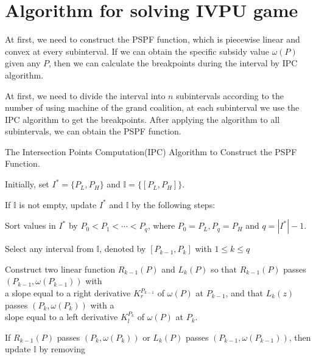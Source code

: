 \section*{Algorithm for solving IVPU game}

At first, we need to construct the PSPF function, which is piecewise linear and convex at every subinterval. If we can obtain the specific subsidy value $\omega(P)$ given any $P$, then we can calculate the breakpoints during the interval by IPC algorithm.

At first, we need to divide the interval into $n$ subintervals according to the  number of using machine of the grand coalition, at each subinterval we use the IPC algorithm to get the breakpoints. After applying the algorithm to all subintervals, we can obtain the PSPF function.


\begin{algorithm}[h]\label{algoIPC}
\caption{The Intersection Points Computation(IPC) Algorithm to Construct the PSPF Function.}
\begin{algorithmic}[1]

\begin{description}
  \justifying
  \item[Step 1.] Initially, set $I^*=\{P_L,P_H\}$ and $\mathbb{I}= \{[P_L,P_H]\}$.
  \item[Step 2.] If $\mathbb{I}$ is not empty, update $I^*$ and $\mathbb{I}$ by the following steps:
  \item[Step 3.] Sort values in $I^*$ by $P_0<P_1<\cdots<P_q$, where $P_0 = P_L,P_q = P_H$ and $q = |I^*|-1$.
  \item[Step 4.]
  Select any interval from $\mathbb{I}$, denoted by $[P_{k-1},P_{k}]$ with $1\leq k \leq q$
  \item[Step 5.]
  Construct two linear function $ R_{k-1}(P)$ and $ L_{k}(P)$ so that $ R_{k-1}(P)$ passes $(P_{k-1},\omega(P_{k-1}))$ with \\
  \vspace{10pt}
  a slope equal to a right derivative $K_{r}^{P_{k-1}}$ of $\omega(P)$ at $P_{k-1}$, and that $L_{k}(z)$ passes $(P_{k},\omega(P_{k}))$ with a \\
  \vspace{10pt}
  slope equal to a left derivative $K_{l}^{P_{k}}$
  of $\omega(P)$ at $P_k$.
  \item[Step 6.] If $R_{k-1}(P)$ passes $(P_{k},\omega(P_{k}))$ or $L_{k}(P)$ passes $(P_{k-1},\omega(P_{k-1}))$, then update $\mathbb{I}$ by removing \\


\end{description}
\end{algorithmic}
\end{algorithm}
